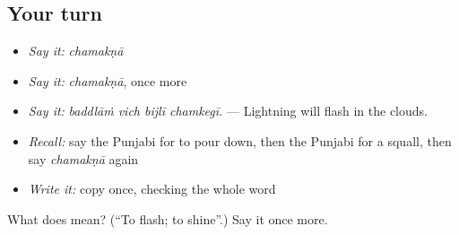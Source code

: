 \subsection*{Your turn}
\begin{itemize}
\raggedright
  \item \emph{Say it:} \emph{chamakṇā}
  \item \emph{Say it:} \emph{chamakṇā}, once more
  \item \emph{Say it:} \emph{baddlāṁ vich bijlī chamkegī.} — Lightning will flash in the clouds.
  \item \emph{Recall:} say the Punjabi for to pour down, then the Punjabi for a squall, then say \emph{chamakṇā} again
  \item \emph{Write it:} copy \textbf{} once, checking the whole word
\end{itemize}

\begin{tcolorbox}[breakable,colback=teal!4,colframe=teal!35!black,title={Before you move on}]
What does  mean? (\textquotedblleft{}To flash; to shine\textquotedblright{}.) Say it once more.
\end{tcolorbox}
